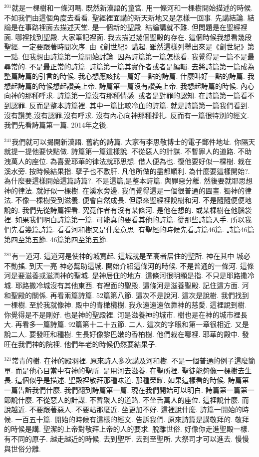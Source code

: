 \documentclass{book}
\begin{document}
$^{201}$就是一棵樹和一條河嗎.
既然新漢語的童宮.
用一條河和一棵樹開始描述的時候.
不如我們由這個角度去看看.
聖經裡面講的新天新地又是怎樣一回事.
先講結論.
結論是在事路裡面去描述天堂.
是一個新的聖殿.
結論講就不難.
但問題是在聖經裡面.
哪裡找到聖殿.
大家筆記裡面.
我去描述幾個聖殿的存在.
這個時候我想看幾段聖經.
一定要跟著時間次序.
由《創世紀》講起.
雖然這樣列舉出來是《創世紀》第一點.
但我想由詩篇第一篇開始討論.
因為詩篇第一篇怎樣看.
我覺得是一篇不是最尋常的.
不是最正常的詩篇.
詩篇第一篇其實作者或者是編輯.
去將詩篇第一篇成為整篇詩篇的引言的時候.
我心想應該找一篇好一點的詩篇.
什麼叫好一點的詩篇.
我想起詩篇的時候想起讚美上帝.
詩篇第一篇沒有讚美上帝.
我想起詩篇的時候.
內心向神的那種呼求.
詩篇第一篇沒有那種情感.
或者是對罪的認知.
在詩篇第一篇看不到認罪.
反而是整本詩篇裡.
其中一篇比較冷血的詩篇.
就是詩篇第一篇我們看到.
沒有讚美,沒有認罪,沒有呼求.
沒有內心向神那種掙扎.
反而有一篇很特別的經文.
我們先看詩篇第一篇.
2014年之後.

$^{241}$我們就可以揭開新漢語.
舊約的詩篇.
大家有李思敬博士的電子郵件地址.
你隔天就提一提他要快點做.
詩篇第一篇這樣說.
不從惡人的計謀.
不暫罪人的道路.
不助洩萬人的座位.
為喜愛耶華的律法就耶思想.
借人便為也.
復他要好似一棵樹.
栽在溪水旁.
按時候結果指.
孽子也不敷肝.
凡他所做的盡都順利.
為什麼要這樣開始?.
為什麼要這樣開始這篇詩篇?.
不是這篇,是整本詩篇.
與罪惡分離.
然後要就耶思想神的律法.
就好似一棵樹.
在溪水旁邊.
我們覺得這是一個很普通的圖畫.
獨神的律法.
不像一棵樹受到滋養.
便會自然成長.
但原來聖經裡說樹和河.
不是隨隨便便地說的.
我們先從詩篇裡看.
究竟作者有沒有某條河.
是他在想的.
或某棵樹在他腦袋裡.
如果我們明白詩篇第一篇.
可能真的要看其他的詩篇.
從那些詩篇入手.
所以我們先看幾篇詩篇.
看看河和樹又是什麼意思.
有聖經的時候先看詩篇46篇.
詩篇46篇第四至第五節.
46篇第四至第五節.

$^{281}$有一道河.
這道河是使神的城寬起.
這城就是至高者居住的聖所.
神在其中 城必不動搖.
到天一亮 神必幫助這城.
開始介紹這條河的時候.
不是普通的一條河.
這條河是要滋養或滋潤神的聖城.
是神居住的地方.
這條河很明顯是指.
不只是耶路撒冷城.
耶路撒冷城沒有其他東西.
有裡面的聖殿.
這條河是滋養聖殿.
記住這方面.
河和聖殿的關係.
再看兩篇詩篇.
52篇第八節.
這次不是說河.
這次是說樹.
我們找到一棵樹.
至於我就像神.
殿中的青橄欖樹.
我永遠遠遠依靠神的慈愛.
這裡說到樹.
你覺得是不是剛好.
也是神的聖殿裡.
河是滋養神的城市.
樹也是在神的城市裡長大.
再看多一篇詩篇.
92篇第十二十五節.
二人.
這次的字眼和第一章很相近.
又是說二人.
要發旺和種樹.
生長好像黎巴嫩的香柏樹.
他們栽在哪裡.
耶華的殿中.
發旺在我們神的院裡.
他們年老的時候仍然要結果子.

$^{321}$常青的樹.
在神的殿羽裡.
原來詩人多次講及河和樹.
不是一個普通的例子這麼簡單.
而是他心目當中有神的聖所.
是用河去滋養.
在聖所裡.
聖徒能夠像一棵樹去生長.
這個似乎是描述.
聖殿裡敬拜那種味道.
那種榮耀.
如果這樣看的時候.
詩篇第一篇告訴我們什麼.
我們翻到詩篇第一篇.
現在我們開始可以明白.
詩篇第一篇第一節說什麼.
不從惡人的計謀.
不暫聚人的道路.
不坐舌萬人的座位.
這裡說什麼.
而說越近.
不要跟著惡人.
不要站那麼近.
坐更加不好.
這裡說什麼.
詩篇一開始的時候.
一百五十篇.
開始的時候有這樣的經文.
告訴我們.
原來詩篇是講敬拜的.
敬拜的時候是講.
聖潔的上帝對敬拜上帝的人的要求.
脫離世俗.
好像你走進聖殿一樣.
有不同的原子.
越走越近的時候.
去到聖所.
去到至聖所.
大祭司才可以進去.
慢慢與世俗分離.
\end{document}
